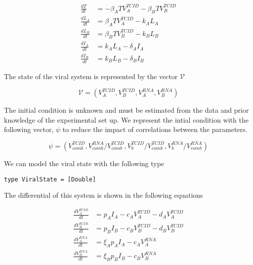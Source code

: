 \documentclass{article}
\begin{document}
\begin{equation}
  \begin{aligned}
    \frac{dT}{dt} &= -\beta_A T V^{TCID}_A -\beta_B T V^{TCID}_B \\
    \frac{dL_A}{dt} &= \beta_A T V^{TCID}_A -k_A L_A \\
    \frac{dL_B}{dt} &= \beta_B T V^{TCID}_B -k_B L_B \\
    \frac{dI_A}{dt} &= k_A L_A -\delta_A I_A \\
    \frac{dI_B}{dt} &= k_B L_B -\delta_B I_B 
  \end{aligned}
\end{equation}

The state of the viral system is represented by the vector \(\mathcal{V}\)

\begin{equation}
  \mathcal{V} = (V^{TCID}_A,V^{TCID}_B,V^{RNA}_A,V^{RNA}_B)
\end{equation}

The initial condition is unknown and must be estimated from the data and prior
knowledge of the experimental set up. We represent the intial condition with the
following vector, \(\psi\) to reduce the impact of correlations between the
parameters.

\begin{equation}
  \psi = (V^{TCID}_{comb},V^{RNA}_{comb}/V^{TCID}_{comb},V^{TCID}_b/V^{TCID}_{comb},V^{RNA}_b/V^{RNA}_{comb})
\end{equation}

We can model the viral state with the following type

\begin{lstlisting}[caption={Give me a real caption}, label=parameterViralDefn]
type ViralState = [Double]
\end{lstlisting}

The differential of this system is shown in the following equations

\begin{equation}
  \begin{aligned}
    \frac{dV^{TCID}_A}{dt} &= p_A I_A - c_A V^{TCID}_A - d_A V^{TCID}_A \\
    \frac{dV^{TCID}_B}{dt} &= p_B I_B - c_B V^{TCID}_B - d_B V^{TCID}_B \\
    \frac{dV^{RNA}_A}{dt} &= \xi_A p_A I_A - c_A V^{RNA}_A \\
    \frac{dV^{RNA}_B}{dt} &= \xi_B p_B I_B - c_B V^{RNA}_B 
  \end{aligned}
\end{equation}
\end{document}
